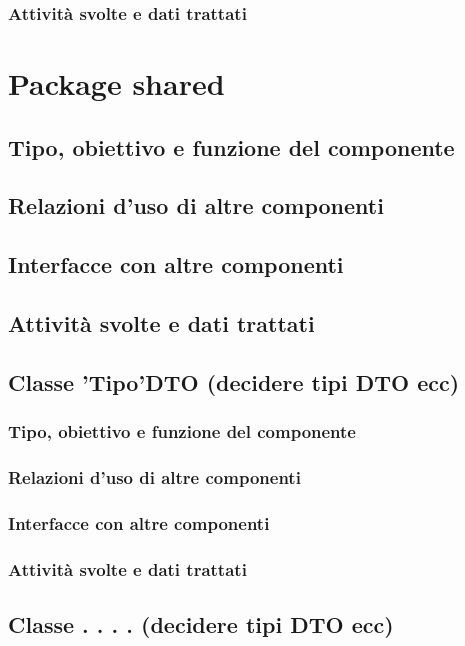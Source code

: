 \subsubsection*{Attivit\`a svolte e dati trattati}

\newpage
\section{Package shared} %
\subsection*{Tipo, obiettivo e funzione del componente}
\subsection*{Relazioni d'uso di altre componenti}
\subsection*{Interfacce con altre componenti}
\subsection*{Attivit\`a svolte e dati trattati}

\subsection{Classe 'Tipo'DTO  (decidere tipi DTO ecc)}
\subsubsection*{Tipo, obiettivo e funzione del componente}
\subsubsection*{Relazioni d'uso di altre componenti}
\subsubsection*{Interfacce con altre componenti}
\subsubsection*{Attivit\`a svolte e dati trattati}

\subsection{Classe . . . .  (decidere tipi DTO ecc)}
